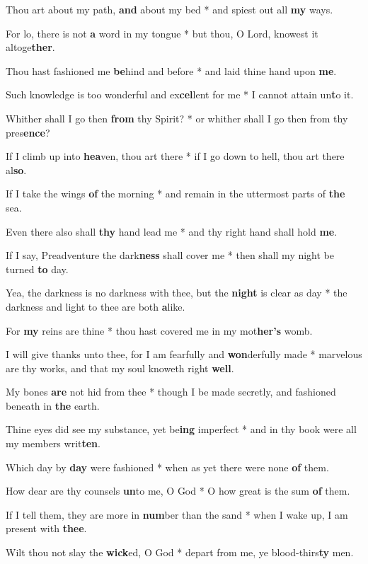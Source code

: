 \begin{multicols}{2}
	Thou art about my path, \textbf{and} about my bed * and spiest out all \textbf{my} ways.
	
	For lo, there is not \textbf{a} word in my tongue * but thou, O Lord, knowest it altoge\textbf{ther}.
	
	Thou hast fashioned me \textbf{be}hind and before * and laid thine hand upon \textbf{me}.
	
	Such knowledge is too wonderful and ex\textbf{cel}lent for me * I cannot attain un\textbf{t}o it.
	
	Whither shall I go then \textbf{from} thy Spirit? * or whither shall I go then from thy pres\textbf{ence}?
	
	If I climb up into \textbf{hea}ven, thou art there * if I go down to hell, thou art there al\textbf{so}.
	
	If I take the wings \textbf{of} the morning * and remain in the uttermost parts of \textbf{the} sea.
	
	Even there also shall \textbf{thy} hand lead me * and thy right hand shall hold \textbf{me}.
	
	If I say, Preadventure the dark\textbf{ness} shall cover me * then shall my night be turned \textbf{to} day.
	
	Yea, the darkness is no darkness with thee, but the \textbf{night} is clear as day * the darkness and light to thee are both \textbf{a}like.
	
	For \textbf{my} reins are thine * thou hast covered me in my mot\textbf{her's} womb.
	
	I will give thanks unto thee, for I am fearfully and \textbf{won}derfully made * marvelous are thy works, and that my soul knoweth right \textbf{well}.
	
	My bones \textbf{are} not hid from thee * though I be made secretly, and fashioned beneath in \textbf{the} earth.
	
	Thine eyes did see my substance, yet be\textbf{ing} imperfect * and in thy book were all my members writ\textbf{ten}.
	
	Which day by \textbf{day} were fashioned * when as yet there were none \textbf{of} them.
	
	How dear are thy counsels \textbf{un}to me, O God * O how great is the sum \textbf{of} them.
	
	If I tell them, they are more in \textbf{num}ber than the sand * when I wake up, I am present with \textbf{thee}.
	
	Wilt thou not slay the \textbf{wick}ed, O God * depart from me, ye blood-thirs\textbf{ty} men.
	

\end{multicols}
